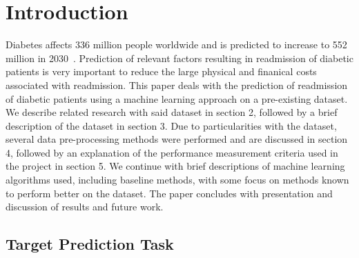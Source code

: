 \documentclass[conference]{IEEEtran}
\begin{document}
%

\section{Introduction}

Diabetes affects 336 million people worldwide and is predicted to increase to 552 million in 2030~\cite{estimates-2011}. Prediction of relevant factors resulting in readmission of diabetic patients is very important to reduce the large physical and finanical costs associated with readmission. This paper deals with the prediction of readmission of diabetic patients using a machine learning approach on a pre-existing dataset. We describe related research with said dataset in section 2, followed by a brief description of the dataset in section 3. Due to particularities with the dataset, several data pre-processing methods were performed and are discussed in section 4, followed by an explanation of the performance measurement criteria used in the project in section 5. We continue with brief descriptions of machine learning algorithms used, including baseline methods, with some focus on methods known to perform better on the dataset. The paper concludes with presentation and discussion of results and future work.

\subsection{Target Prediction Task}
\end{document}
